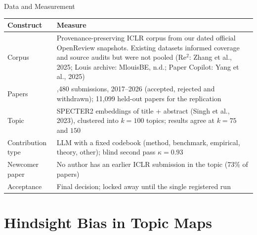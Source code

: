 \documentclass[aspectratio=169,11pt]{beamer}
\newcommand{\rc}[1]{{\color{note}\footnotesize(#1)}}
\begin{document}
\begin{frame}{Data and Measurement}
  \begin{table}
    \centering\small
    \begin{tabularx}{\textwidth}{@{}l >{\raggedright\arraybackslash}X@{}}
      \toprule
      Construct & Measure \\
      \midrule
      Corpus & Provenance-preserving ICLR corpus from our dated official OpenReview snapshots. Existing datasets
        informed coverage and source audits but were not pooled \rc{Re$^2$: Zhang et al., 2025; Louis archive:
        MlouisBE, n.d.; Paper Copilot: Yang et al., 2025} \\
      \addlinespace
      Papers & 43,480 submissions, 2017--2026 (accepted, rejected and withdrawn); 11,099 held-out papers for the
        replication \\
      \addlinespace
      Topic & SPECTER2 embeddings of title + abstract \rc{Singh et al., 2023}, clustered into $k = 100$ topics;
        results agree at $k = 75$ and $150$ \\
      \addlinespace
      Contribution type & LLM with a fixed codebook (method, benchmark, empirical, theory, other); blind second
        pass $\kappa = 0.93$ \\
      \addlinespace
      Newcomer paper & No author has an earlier ICLR submission in the topic (73\% of papers) \\
      \addlinespace
      Acceptance & Final decision; locked away until the single registered run \\
      \bottomrule
    \end{tabularx}
  \end{table}
\end{frame}

\section{Hindsight Bias in Topic Maps}
\end{document}
